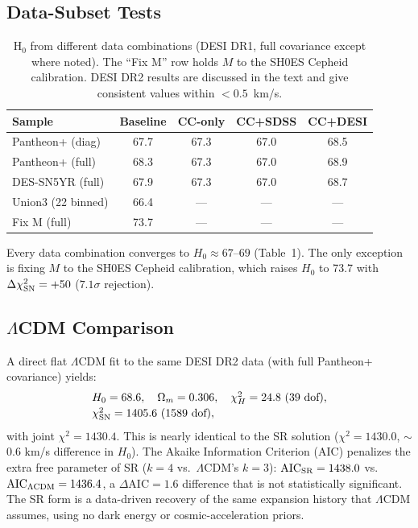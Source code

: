 \documentclass[twocolumn]{aastex631}
\begin{document}
\subsection{Data-Subset Tests}
\begin{table}
\centering
\caption{H$_0$ from different data combinations (DESI DR1, full covariance
except where noted).  The ``Fix M'' row holds $M$ to the SH0ES Cepheid
calibration.  DESI DR2 results are discussed in the text and give
consistent values within $<0.5$~km/s.}
\begin{tabular}{lcccc}
\hline
Sample & Baseline & CC-only & CC+SDSS & CC+DESI \\
\hline
Pantheon+ (diag)    & 67.7 & 67.3 & 67.0 & 68.5 \\
Pantheon+ (full)    & 68.3 & 67.3 & 67.0 & 68.9 \\
DES-SN5YR (full)    & 67.9 & 67.3 & 67.0 & 68.7 \\
Union3 (22 binned)  & 66.4 & ---  & ---  & ---  \\
\hline
Fix M (full)        & 73.7 & ---  & ---  & ---  \\
\hline
\end{tabular}
\label{tab:subset}
\end{table}

Every data combination converges to $H_0 \approx 67$--$69$ (Table~1).  The
only exception is fixing $M$ to the SH0ES Cepheid calibration, which raises
$H_0$ to 73.7 with $\Delta\chi^2_{\rm SN} = +50$ ($7.1\sigma$ rejection).

\subsection{$\Lambda$CDM Comparison}
A direct flat $\Lambda$CDM fit to the same DESI DR2 data (with full Pantheon+
covariance) yields:
\[
\begin{array}{l}
H_0 = 68.6,\quad \Omega_m = 0.306,\quad \chi^2_H = 24.8\ (39\ \text{dof}),\\[2pt]
\chi^2_{\rm SN} = 1405.6\ (1589\ \text{dof}),
\end{array}
\]
with joint $\chi^2 = 1430.4$.  This is nearly identical to the SR solution
($\chi^2 = 1430.0$, $\sim$0.6 km/s difference in $H_0$).  The Akaike
Information Criterion (AIC) penalizes the extra free parameter of SR
($k=4$ vs.\ $\Lambda$CDM's $k=3$):
$\text{AIC}_{\rm SR} = 1438.0$ vs.\ $\text{AIC}_{\Lambda\rm CDM} = 1436.4$,
a $\Delta\text{AIC} = 1.6$ difference that is not statistically
significant.  The SR form is a data-driven recovery of the same expansion
history that $\Lambda$CDM assumes, using no dark energy or
cosmic-acceleration priors.
\end{document}
